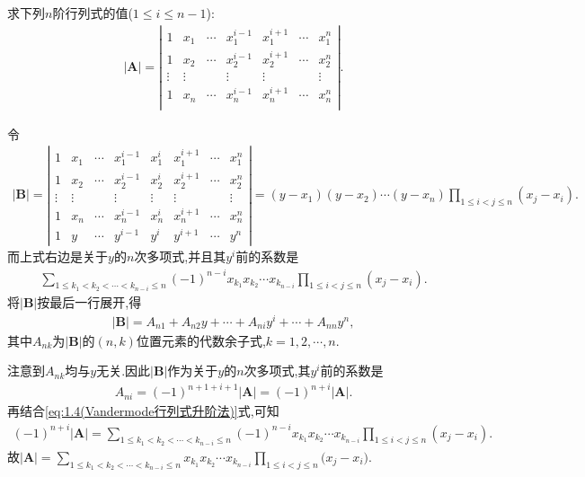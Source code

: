 \documentclass[../../main.tex]{subfiles}%
\begin{document}
\begin{example}\label{升阶法的应用(2)例题}
求下列$n$阶行列式的值($1\leqslant i\leqslant n-1$):
\begin{align*}
|\boldsymbol{A}|=\left| \begin{matrix}
1&		x_1&		\cdots&		x_{1}^{i-1}&		x_{1}^{i+1}&		\cdots&		x_{1}^{n}\\
1&		x_2&		\cdots&		x_{2}^{i-1}&		x_{2}^{i+1}&		\cdots&		x_{2}^{n}\\
\vdots&		\vdots&		&		\vdots&		\vdots&		&		\vdots\\
1&		x_n&		\cdots&		x_{n}^{i-1}&		x_{n}^{i+1}&		\cdots&		x_{n}^{n}\\
\end{matrix} \right|.
\end{align*}
\end{example}
\begin{solution}

令
\begin{align*}
|\boldsymbol{B}|=\left|\begin{matrix}
1 & x_1 & \cdots & x_{1}^{i - 1} & x_{1}^{i} & x_{1}^{i + 1} & \cdots & x_{1}^{n}\\
1 & x_2 & \cdots & x_{2}^{i - 1} & x_{2}^{i} & x_{2}^{i + 1} & \cdots & x_{2}^{n}\\
\vdots & \vdots &  & \vdots & \vdots & \vdots &  & \vdots\\
1 & x_n & \cdots & x_{n}^{i - 1} & x_{n}^{i} & x_{n}^{i + 1} & \cdots & x_{n}^{n}\\
1 & y & \cdots & y^{i - 1} & y^i & y^{i + 1} & \cdots & y^n
\end{matrix}\right|=(y - x_1)(y - x_2)\cdots (y - x_n)\prod_{1\leqslant i < j\leqslant n}(x_j - x_i).
\end{align*}
而上式右边是关于\(y\)的\(n\)次多项式,并且其\(y^i\)前的系数是
\begin{align}\label{eq:1.4(Vandermode行列式升阶法)}
\sum_{1\leqslant k_1 < k_2 < \cdots < k_{n - i}\leqslant n}(-1)^{n - i}x_{k_1}x_{k_2}\cdots x_{k_{n - i}}\prod_{1\leqslant i < j\leqslant n}(x_j - x_i).
\end{align}
将\(|\boldsymbol{B}|\)按最后一行展开,得
\begin{align*}
|\boldsymbol{B}|=A_{n1} + A_{n2}y + \cdots + A_{ni}y^i + \cdots + A_{nn}y^n, 
\end{align*}
其中\(A_{nk}\)为\(|\boldsymbol{B}|\)的\((n,k)\)位置元素的代数余子式,\(k = 1,2,\cdots,n\).

注意到\(A_{nk}\)均与\(y\)无关.因此\(|\boldsymbol{B}|\)作为关于\(y\)的\(n\)次多项式,其\(y^i\)前的系数是
\begin{align*}
A_{ni}=(-1)^{n + 1 + i + 1}|\boldsymbol{A}|=(-1)^{n + i}|\boldsymbol{A}|.
\end{align*}
再结合\eqref{eq:1.4(Vandermode行列式升阶法)}式,可知
\begin{align*}
(-1)^{n + i}|\boldsymbol{A}|=\sum_{1\leqslant k_1 < k_2 < \cdots < k_{n - i}\leqslant n}(-1)^{n - i}x_{k_1}x_{k_2}\cdots x_{k_{n - i}}\prod_{1\leqslant i < j\leqslant n}(x_j - x_i). 
\end{align*}
故\(|\boldsymbol{A}|=\sum_{1\leqslant k_1<k_2<\cdots <k_{n-i}\leqslant n}{x_{k_1}x_{k_2}\cdots x_{k_{n-i}}\prod_{1\leqslant i<j\leqslant n}{(x_j}-x_i)}\).

\end{solution}
\end{document}
